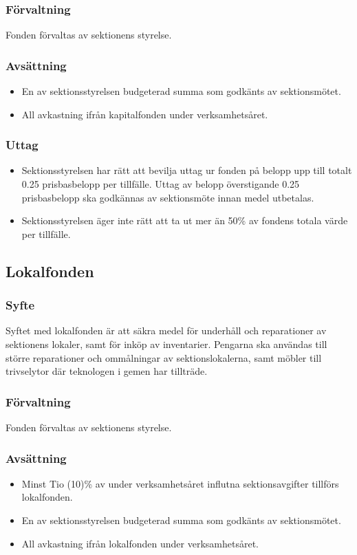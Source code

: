 \documentclass[a4paper]{dtek}
\newcommand{\prisbasbelopp}[1]{
    #1 prisbasbelopp
    \ifdef{\nuvarandeprisbasbelopp}{
        \marginpar{
            \small{ \textbf{\roundandprint{\xintiexpr#1 * \nuvarandeprisbasbelopp\relax}kr}}
        }
    }{}
}
\begin{document}
\subsubsection{Förvaltning}
Fonden förvaltas av sektionens styrelse.
\subsubsection{Avsättning}
\begin{itemize}
\item En av sektionsstyrelsen budgeterad summa som godkänts av sektionsmötet.
\item All avkastning ifrån kapitalfonden under verksamhetsåret.
\end{itemize}
\subsubsection{Uttag}
\begin{itemize}
\item Sektionsstyrelsen har rätt att bevilja uttag ur fonden på belopp upp till totalt \prisbasbelopp{0.25} per tillfälle. Uttag av belopp överstigande \prisbasbelopp{0.25} ska godkännas av sektionsmöte innan medel utbetalas.
\item Sektionsstyrelsen äger inte rätt att ta ut mer än 50\% av fondens totala värde per tillfälle.
\end{itemize}

\subsection{Lokalfonden}
\subsubsection{Syfte}
\label{sec:lokalfond_syfte}
Syftet med lokalfonden är att säkra medel för underhåll och reparationer av sektionens lokaler, samt för inköp av inventarier. Pengarna ska användas till större reparationer och ommålningar av sektionslokalerna, samt möbler till trivselytor där teknologen i gemen har tillträde.
\subsubsection{Förvaltning}
Fonden förvaltas av sektionens styrelse.
\subsubsection{Avsättning}
\label{sec:lokalfond_avsattning}
\begin{itemize}
\item Minst Tio (10)\% av under verksamhetsåret influtna sektionsavgifter tillförs lokalfonden.
\item En av sektionsstyrelsen budgeterad summa som godkänts av sektionsmötet.
\item All avkastning ifrån lokalfonden under verksamhetsåret.
\end{itemize}
\end{document}
